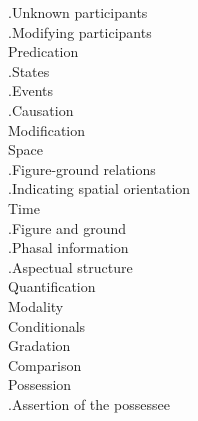 \documentclass[a4paper,12pt]{article}
\begin{document}
\begin{figure}
{.\hspace{.5cm}Unknown participants \\
.\hspace{.5cm}Modifying participants \\
Predication\\
.\hspace{.5cm}States \\
.\hspace{.5cm}Events \\
.\hspace{.5cm}Causation \\
Modification\\
Space\\
.\hspace{.5cm}Figure-ground relations \\
.\hspace{.5cm}Indicating   spatial orientation  \\
Time\\
.\hspace{.5cm}Figure and ground \\
.\hspace{.5cm}Phasal information \\
.\hspace{.5cm}Aspectual structure \\
Quantification\\
Modality\\
Conditionals\\
Gradation\\
Comparison\\
Possession\\
.\hspace{.5cm}Assertion of the possessee \\
}
\end{figure}
\end{document}
